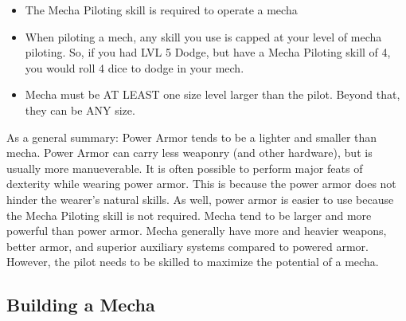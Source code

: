\documentclass[twoside]{book}
\begin{document}
\begin{itemize}
      
  \item  The Mecha Piloting skill is required to operate a
               mecha 
  \item  When piloting a mech, any skill you use is capped at
               your level of mecha piloting. So, if you had LVL 5 Dodge,
               but have a Mecha Piloting skill of 4, you would roll 4
               dice to dodge in your mech. 
  \item  Mecha must be AT LEAST one size level larger than
               the pilot. Beyond that, they can be ANY size. 
\end{itemize}
    As a general summary: Power Armor tends to be a
             lighter and smaller than mecha. Power Armor can carry less
             weaponry (and other hardware), but is usually more
             manueverable. It is often possible to perform major feats of
             dexterity while wearing power armor. This is because the
             power armor does not hinder the wearer's natural
             skills. As well, power armor is easier to use because the
             Mecha Piloting skill is not required.   Mecha tend to be larger and more powerful than power
             armor. Mecha generally have more and heavier weapons, better
             armor, and superior auxiliary systems compared to powered
             armor. However, the pilot needs to be skilled to maximize
             the potential of a mecha. 
    

\subsection{Building a Mecha}
    
\end{document}
